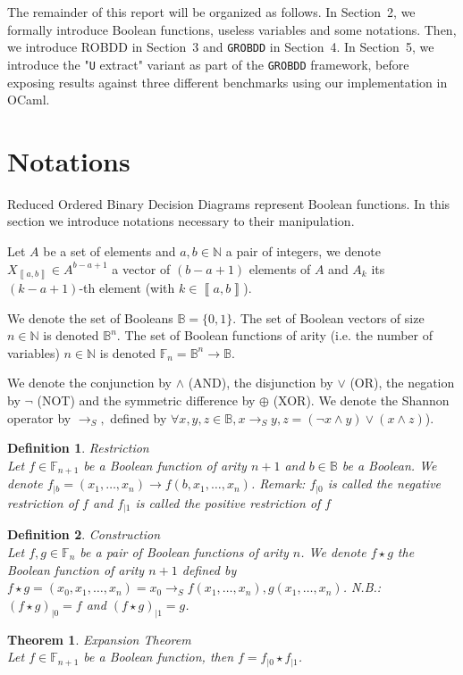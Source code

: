 \documentclass[a4paper,10pt]{article}
\newcommand{\shannon}[3]{{#1}\longrightarrow_S{#2}, {#3}}
\newcommand{\N}{\mathbb{N}}%
\newcommand{\B}{\mathbb{B}}
\newcommand{\F}{\mathbb{F}}
\newcommand{\uextract}{"\texttt{U} extract"}
\newcommand{\GroBdd}{\texttt{GROBDD}}
\newcommand{\bras}[1]{{\left\llbracket{#1}\right\rrbracket}}
\newcommand\restr[2]{{#1}_{\left|{#2}\right.}}
\newtheorem{newtheo}{Theorem}
\newcommand{\theorem}[2]{\begin{newtheo}{\textsf{#1}\\} #2 \end{newtheo}}
\newtheorem{newdef}{Definition}
\newcommand{\definition}[2]{\begin{newdef}{#1\\}#2\end{newdef}}
\begin{document}
The remainder of this report will be organized as follows.
In Section~2, we formally introduce Boolean functions, useless variables and some notations.
Then, we introduce ROBDD in Section~3 and \GroBdd{} in Section~4.
In Section~5, we introduce the \uextract{} variant as part of the \GroBdd{} framework, before exposing results against three different benchmarks \cite{BenchSatlib, BenchLgsynth91, BenchIscas99} using our implementation in OCaml.

\section{Notations}

Reduced Ordered Binary Decision Diagrams represent Boolean functions.
In this section we introduce notations necessary to their manipulation.

Let $A$ be a set of elements and $a, b\in\N$ a pair of integers, we denote $X_{\bras{a, b}}\in A^{b-a+1}$ a vector of $(b-a+1)$ elements of $A$ and $A_k$ its $(k-a+1)$-th element (with $k\in\bras{a, b}$).

We denote the set of Booleans $\B = \{0, 1\}$.
The set of Boolean vectors of size $n\in\N$ is denoted $\B^n$.
The set of Boolean functions of arity (i.e. the number of variables) $n\in\N$ is denoted $\F_n = \B^n \longrightarrow \B$.


We denote the conjunction by $\land$ (AND), the disjunction by $\lor$ (OR), the negation by $\lnot$ (NOT) and the symmetric difference by $\oplus$ (XOR).
We denote the Shannon operator by $\shannon{}{}{}$ defined by $\forall x, y, z\in\B, \shannon{x}{y}{z} = (\lnot x \land y) \lor (x \land z)$).

\definition{Restriction}
{
	Let $f\in\F_{n+1}$ be a Boolean function of arity $n+1$ and $b\in\B$ be a Boolean.
	We denote $\restr{f}{b} = (x_1, \dots, x_n) \longrightarrow f(b, x_1, \dots, x_n)$.
	Remark: $\restr{f}{0}$ is called the negative restriction of $f$ and $\restr{f}{1}$ is called the positive restriction of $f$
}

\definition{Construction}
{
	Let $f, g\in\F_n$ be a pair of Boolean functions of arity $n$.
	We denote $f\star{}g$ the Boolean function of arity $n+1$ defined by $ f\star{}g = (x_0, x_1, \dots, x_n) = \shannon{x_0}{f(x_1, \dots, x_n)}{g(x_1, \dots, x_n)}$.
	N.B.: $\restr{(f\star g)}{0} = f$ and $ \restr{(f\star g)}{1} = g$.
}

\theorem{Expansion Theorem}{
Let $f\in\F_{n+1}$ be a Boolean function, then $f = \restr{f}{0} \star \restr{f}{1}$.
}
\end{document}

